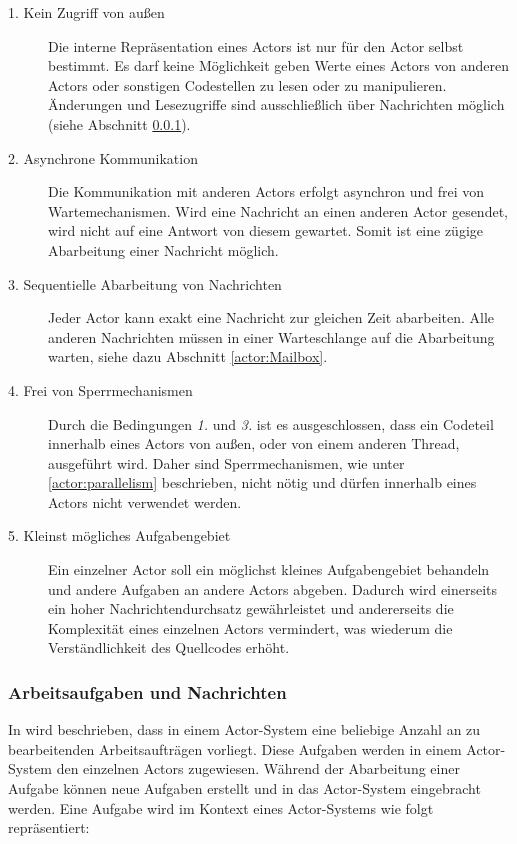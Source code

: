 \begin{description}
  \item[1. Kein Zugriff von außen]\label{actor:requirements:shareNothing}
  Die interne Repräsentation eines Actors ist nur für den Actor selbst bestimmt. Es darf keine Möglichkeit geben Werte eines Actors von anderen Actors oder sonstigen Codestellen zu lesen oder zu manipulieren. Änderungen und Lesezugriffe sind ausschließlich über Nachrichten möglich (siehe Abschnitt \ref{sec:actors:messages}). 
  \item[2. Asynchrone Kommunikation]\label{actor:requirements:AsynchronCommunication}
  Die Kommunikation mit anderen Actors erfolgt asynchron und frei von Wartemechanismen. Wird eine Nachricht an einen anderen Actor gesendet, wird nicht auf eine Antwort von diesem gewartet. Somit ist eine zügige Abarbeitung einer Nachricht möglich.
  \item[3. Sequentielle Abarbeitung von Nachrichten]
  Jeder Actor kann exakt eine Nachricht zur gleichen Zeit abarbeiten. Alle anderen Nachrichten müssen in einer Warteschlange auf die Abarbeitung warten, siehe dazu Abschnitt \ref{actor:Mailbox}.
  \item[4. Frei von Sperrmechanismen]
  Durch die Bedingungen \textit{1.} und \textit{3.} ist es ausgeschlossen, dass ein Codeteil innerhalb eines Actors von außen, oder von einem anderen Thread, ausgeführt wird. Daher sind Sperrmechanismen, wie unter \ref{actor:parallelism} beschrieben, nicht nötig und dürfen innerhalb eines Actors nicht verwendet werden.
  \item[5. Kleinst mögliches Aufgabengebiet]
  Ein einzelner Actor soll ein möglichst kleines Aufgabengebiet behandeln und andere Aufgaben an andere Actors abgeben. Dadurch wird einerseits ein hoher Nachrichtendurchsatz gewährleistet und andererseits die Komplexität eines einzelnen Actors vermindert, was wiederum die Verständlichkeit des Quellcodes erhöht.
\end{description}

\subsubsection{Arbeitsaufgaben und Nachrichten}\label{sec:actors:messages}
In \cite{Agha1985ActorsSystems} wird beschrieben, dass in einem Actor-System eine beliebige Anzahl an zu bearbeitenden Arbeitsaufträgen vorliegt. Diese Aufgaben werden in einem Actor-System den einzelnen Actors zugewiesen. Während der Abarbeitung einer Aufgabe können neue Aufgaben erstellt und in das Actor-System eingebracht werden. Eine Aufgabe wird im Kontext eines Actor-Systems wie folgt repräsentiert:

